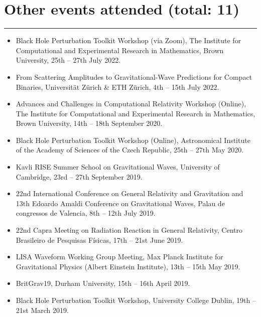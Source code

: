 \documentclass[10.5pt, oneside]{article}   	%
\begin{document}
{\color{Sectioncolour}
\section*{Other events attended {\rm (total: 11)}}
\vspace{-3mm}
\noindent\rule{\linewidth}{0.6pt}}
\begin{itemize}
\item Black Hole Perturbation Toolkit Workshop (via Zoom), The Institute for Computational and Experimental Research in Mathematics, Brown University, 25th -- 27th July 2022.
\item From Scattering Amplitudes to Gravitational-Wave Predictions for Compact Binaries, Universität Zürich \& ETH Zürich, 4th -- 15th July 2022.
\item Advances and Challenges in Computational Relativity Workshop (Online), The Institute for Computational and Experimental Research in Mathematics, Brown University, 14th -- 18th September 2020.
\item Black Hole Perturbation Toolkit Workshop (Online), Astronomical Institute of the Academy of Sciences of the Czech Republic, 25th -- 27th May 2020.
\item Kavli RISE Summer School on Gravitational Waves, University of Cambridge, 23rd -- 27th September 2019.
\item 22nd International Conference on General Relativity and Gravitation and 13th Edoardo Amaldi Conference on Gravitational Waves, Palau de congressos de Valencia, 8th -- 12th July 2019.
\item 22nd Capra Meeting on Radiation Reaction in General Relativity, Centro Brasileiro de Pesquisas Físicas, 17th -- 21st June 2019.
\item LISA Waveform Working Group Meeting, Max Planck Institute for Gravitational Physics (Albert Einstein Institute), 13th -- 15th May 2019.
\item BritGrav19, Durham University, 15th -- 16th April 2019.
\item Black Hole Perturbation Toolkit Workshop, University College Dublin, 19th -- 21st March 2019.
\end{itemize} 
\end{document}
